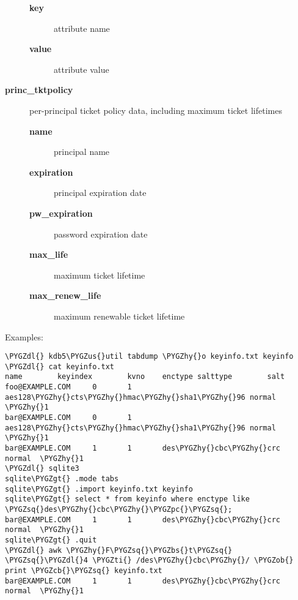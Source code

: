 \documentclass[letterpaper,10pt,english]{sphinxmanual}
\def\PYGZbs{\char`\\}
\def\PYGZus{\char`\_}
\def\PYGZob{\char`\{}
\def\PYGZcb{\char`\}}
\def\PYGZgt{\char`\>}
\def\PYGZpc{\char`\%}
\def\PYGZdl{\char`\$}
\def\PYGZhy{\char`\-}
\def\PYGZsq{\char`\'}
\def\PYGZti{\char`\~}
\begin{document}
\begin{description}
\begin{description}
\item[{\textbf{key}}] \leavevmode
attribute name

\item[{\textbf{value}}] \leavevmode
attribute value

\end{description}

\item[{\textbf{princ\_tktpolicy}}] \leavevmode
per-principal ticket policy data, including maximum ticket
lifetimes
\begin{description}
\item[{\textbf{name}}] \leavevmode
principal name

\item[{\textbf{expiration}}] \leavevmode
principal expiration date

\item[{\textbf{pw\_expiration}}] \leavevmode
password expiration date

\item[{\textbf{max\_life}}] \leavevmode
maximum ticket lifetime

\item[{\textbf{max\_renew\_life}}] \leavevmode
maximum renewable ticket lifetime

\end{description}

\end{description}

Examples:

\begin{Verbatim}[commandchars=\\\{\}]
\PYGZdl{} kdb5\PYGZus{}util tabdump \PYGZhy{}o keyinfo.txt keyinfo
\PYGZdl{} cat keyinfo.txt
name        keyindex        kvno    enctype salttype        salt
foo@EXAMPLE.COM     0       1       aes128\PYGZhy{}cts\PYGZhy{}hmac\PYGZhy{}sha1\PYGZhy{}96 normal  \PYGZhy{}1
bar@EXAMPLE.COM     0       1       aes128\PYGZhy{}cts\PYGZhy{}hmac\PYGZhy{}sha1\PYGZhy{}96 normal  \PYGZhy{}1
bar@EXAMPLE.COM     1       1       des\PYGZhy{}cbc\PYGZhy{}crc     normal  \PYGZhy{}1
\PYGZdl{} sqlite3
sqlite\PYGZgt{} .mode tabs
sqlite\PYGZgt{} .import keyinfo.txt keyinfo
sqlite\PYGZgt{} select * from keyinfo where enctype like \PYGZsq{}des\PYGZhy{}cbc\PYGZhy{}\PYGZpc{}\PYGZsq{};
bar@EXAMPLE.COM     1       1       des\PYGZhy{}cbc\PYGZhy{}crc     normal  \PYGZhy{}1
sqlite\PYGZgt{} .quit
\PYGZdl{} awk \PYGZhy{}F\PYGZsq{}\PYGZbs{}t\PYGZsq{} \PYGZsq{}\PYGZdl{}4 \PYGZti{} /des\PYGZhy{}cbc\PYGZhy{}/ \PYGZob{} print \PYGZcb{}\PYGZsq{} keyinfo.txt
bar@EXAMPLE.COM     1       1       des\PYGZhy{}cbc\PYGZhy{}crc     normal  \PYGZhy{}1
\end{Verbatim}
\end{document}
